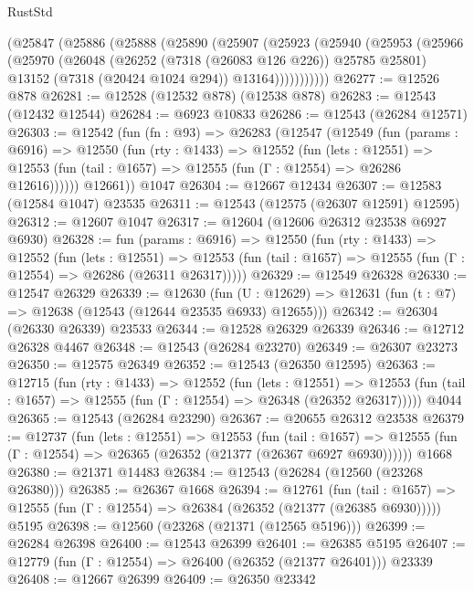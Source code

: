 \begin{lexlean}{RustStd}
\begin{coremodule}
    (@25847
      (@25886
        (@25888
          (@25890
            (@25907
              (@25923
                (@25940
                  (@25953
                    (@25966
                      (@25970
                        (@26048
                          (@26252 (@7318 (@26083 @126 @226)) @25785 @25801)
                          @13152
                          (@7318 (@20424 @1024 @294))
                          @13164)))))))))))
@26277 := @12526 @878
@26281 := @12528 (@12532 @878) (@12538 @878)
@26283 := @12543 (@12432 @12544)
@26284 := @6923 @10833
@26286 := @12543 (@26284 @12571)
@26303 := @12542
    (fun (fn : @93) =>
    @26283
      (@12547
        (@12549
          (fun (params : @6916) =>
          @12550
            (fun (rty : @1433) =>
            @12552
              (fun (lets : @12551) =>
              @12553 (fun (tail : @1657) => @12555 (fun (Γ : @12554) => @26286 @12616))))))
        @12661))
    @1047
@26304 := @12667 @12434
@26307 := @12583 (@12584 @1047) @23535
@26311 := @12543 (@12575 (@26307 @12591) @12595)
@26312 := @12607 @1047
@26317 := @12604 (@12606 @26312 @23538 @6927 @6930)
@26328 := fun (params : @6916) =>
  @12550
    (fun (rty : @1433) =>
    @12552
      (fun (lets : @12551) =>
      @12553 (fun (tail : @1657) => @12555 (fun (Γ : @12554) => @26286 (@26311 @26317)))))
@26329 := @12549 @26328
@26330 := @12547 @26329
@26339 := @12630
    (fun (U : @12629) => @12631 (fun (t : @7) => @12638 (@12543 (@12644 @23535 @6933) @12655)))
@26342 := @26304 (@26330 @26339) @23533
@26344 := @12528 @26329 @26339
@26346 := @12712 @26328 @4467
@26348 := @12543 (@26284 @23270)
@26349 := @26307 @23273
@26350 := @12575 @26349
@26352 := @12543 (@26350 @12595)
@26363 := @12715
    (fun (rty : @1433) =>
    @12552
      (fun (lets : @12551) =>
      @12553 (fun (tail : @1657) => @12555 (fun (Γ : @12554) => @26348 (@26352 @26317)))))
    @4044
@26365 := @12543 (@26284 @23290)
@26367 := @20655 @26312 @23538
@26379 := @12737
    (fun (lets : @12551) =>
    @12553
      (fun (tail : @1657) =>
      @12555 (fun (Γ : @12554) => @26365 (@26352 (@21377 (@26367 @6927 @6930))))))
    @1668
@26380 := @21371 @14483
@26384 := @12543 (@26284 (@12560 (@23268 @26380)))
@26385 := @26367 @1668
@26394 := @12761
    (fun (tail : @1657) => @12555 (fun (Γ : @12554) => @26384 (@26352 (@21377 (@26385 @6930)))))
    @5195
@26398 := @12560 (@23268 (@21371 (@12565 @5196)))
@26399 := @26284 @26398
@26400 := @12543 @26399
@26401 := @26385 @5195
@26407 := @12779 (fun (Γ : @12554) => @26400 (@26352 (@21377 @26401))) @23339
@26408 := @12667 @26399
@26409 := @26350 @23342

\end{coremodule}
\end{lexlean}
